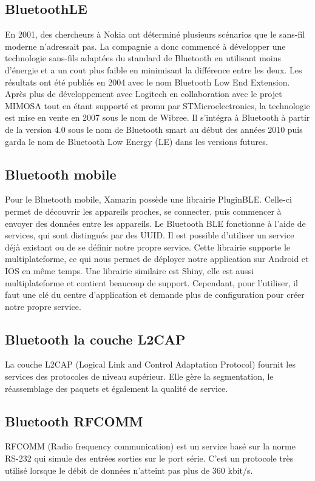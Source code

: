 \documentclass[12pt,fleqn]{article}
\begin{document}
\subsection{BluetoothLE}
En 2001, des chercheurs à Nokia ont déterminé plusieurs scénarios que le sans-fil moderne n'adressait pas. La compagnie a donc commencé à développer une technologie sans-fils adaptées du standard de Bluetooth en utilisant moins d'énergie et a un cout plus faible en minimisant la différence entre les deux. Les résultats ont été publiés en 2004 avec le nom Bluetooth Low End Extension\cite{BLEStart}. Après plus de développement avec Logitech en collaboration avec le projet MIMOSA tout en étant supporté et promu par STMicroelectronics, la technologie est mise en vente en 2007 sous le nom de Wibree\cite{BLEMarket}. Il s'intégra à Bluetooth à partir de la version 4.0 sous le nom de Bluetooth smart au début des années 2010 puis garda le nom de Bluetooth Low Energy (LE) dans les versions futures\cite{BLE}.

\subsection{Bluetooth mobile}
Pour le Bluetooth mobile, Xamarin possède une librairie PluginBLE\cite{PluginBLE}. Celle-ci permet de découvrir les appareils proches, se connecter, puis commencer à envoyer des données entre les appareils. Le Bluetooth BLE fonctionne à l'aide de services, qui sont distingués par des UUID. Il est possible d'utiliser un service déjà existant ou de se définir notre propre service. Cette librairie supporte le multiplateforme, ce qui nous permet de déployer notre application sur Android et IOS en même temps. Une librairie similaire est Shiny\cite{Shiny}, elle est aussi multiplateforme et contient beaucoup de support. Cependant, pour l'utiliser, il faut une clé du centre d'application et demande plus de configuration pour créer notre propre service. 

\subsection{Bluetooth la couche L2CAP}
La couche L2CAP (Logical Link and Control  Adaptation Protocol) fournit les services des protocoles de niveau supérieur. Elle gère la segmentation, le réassemblage des paquets et également la qualité de service.

\subsection{Bluetooth RFCOMM}
RFCOMM (Radio frequency communication) est un service basé sur la norme RS-232 qui simule des entrées sorties sur le port série. C'est un protocole très utilisé lorsque le débit de données n'atteint pas plus de 360 kbit/s. 
\end{document}
